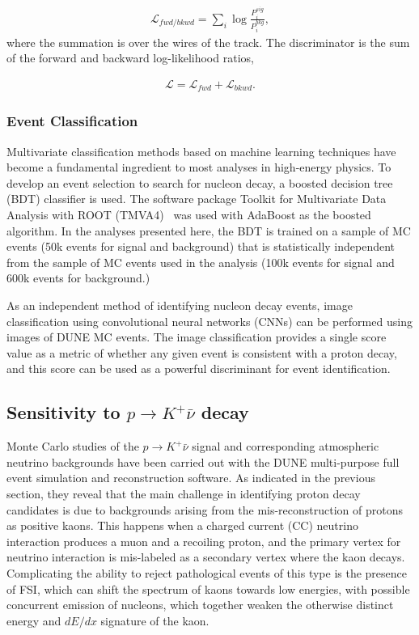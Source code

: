 \begin{align}
 \mathcal{L}_{fwd/bkwd} = \sum_i \log\frac{P^{sig}_i}{P^{bkg}_i}, 
\end{align}
where the summation is over the wires of the track. The discriminator is the sum of the forward and backward log-likelihood ratios,

\begin{align}
    \mathcal{L} = \mathcal{L}_{fwd} + \mathcal{L}_{bkwd}.\label{eqn:L}
\end{align}

\subsubsection{Event Classification}

Multivariate classification methods based on machine learning techniques have become a fundamental ingredient to most analyses in high-energy physics. 
To develop an event selection to search for nucleon decay, a boosted decision tree (BDT) classifier is used. The software package Toolkit for Multivariate Data Analysis with ROOT (TMVA4)~\cite{Hocker:2007ht}
was used with AdaBoost as the boosted algorithm.  In the analyses presented here, the BDT is trained on a sample of MC events (50k events for signal and background) that is statistically independent from the sample of MC events used in the analysis (100k events for signal and 600k events for background.)

As an independent method of identifying nucleon decay events, image classification using convolutional neural networks (CNNs) can be performed using \twod images of DUNE MC events. The image classification provides a single score value as a metric of whether any given event is consistent with a proton decay, and this score can be used as a powerful discriminant for event identification.

\subsection{Sensitivity to $p\to K^+\bar{\nu}$ decay}
\label{subsec:nonaccel-ndk-nubarkplus}

Monte Carlo studies of the $p\to K^+ \bar{\nu}$ signal and corresponding atmospheric neutrino backgrounds have been carried out with the DUNE multi-purpose full event simulation and reconstruction software.  As indicated in the previous section, they reveal that the main challenge in identifying proton decay candidates is due to backgrounds arising from the mis-reconstruction of protons as positive kaons. This happens when a charged current (CC) neutrino interaction produces a muon and a recoiling proton, and the primary vertex for neutrino interaction is mis-labeled as a secondary vertex where the kaon decays.  Complicating the ability to reject pathological events of this type is the presence of FSI, which can shift the spectrum of kaons towards low energies, with possible concurrent emission of nucleons, which together weaken the otherwise distinct energy and $dE/dx$ signature of the kaon. 

